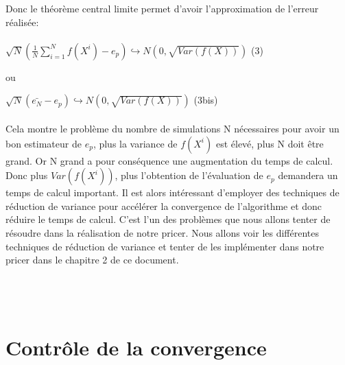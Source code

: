 \documentclass[12pt]{report}
\begin{document}
Donc le théorème central limite permet d'avoir l'approximation de l'erreur réalisée:\\\\
$\sqrt{N}(\frac{1}{N}\sum_{i=1}^{N}f(X^i)-e_p)\hookrightarrow N(0,\sqrt{Var(f(X))})$ \hspace{2cm} (3)
\begin{center}
	 ou\newline
\end{center}
$\sqrt{N}(\bar{e_N}-e_p)\hookrightarrow N(0,\sqrt{Var(f(X))})$ \hspace{4cm} (3bis)
\\\\
Cela montre le problème du nombre de simulations N nécessaires pour avoir un bon estimateur de $e_p$, plus la variance de $f(X^i)$ est élevé, plus N doit être grand.\newline
Or N grand a pour conséquence une augmentation du temps de calcul.\newline
Donc plus $Var(f(X^i))$, plus l’obtention de l’évaluation de $e_p$ demandera un temps de calcul important.\newline
Il est alors intéressant d’employer des techniques de réduction de variance pour accélérer la convergence de l’algorithme et donc réduire le temps de calcul.\newline
C’est l’un des problèmes que nous allons tenter de résoudre dans la réalisation de notre pricer.\newline
Nous allons voir les différentes techniques de réduction de variance et tenter de les implémenter dans notre pricer dans le chapitre 2 de ce document.
\\\\\\\\
\section{Contrôle de la convergence}
\end{document}
